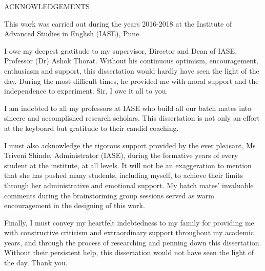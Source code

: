 \newpage
{}
\begin{center}
    \LARGE ACKNOWLEDGEMENTS
\end{center}
This  work  was  carried  out  during  the  years  2016-2018  at  the  Institute  of  Advanced  Studies  in  English  (IASE),  Pune.  

I  owe  my  deepest  gratitude  to  my  supervisor,  Director  and  Dean  of  IASE,  Professor  (Dr)  Ashok  Thorat.  Without  his  continuous  optimism,  encouragement,  enthusiasm  and  support,  this  dissertation  would  hardly  have  seen  the  light  of  the  day.  During  the  most  difficult  times,  he  provided  me  with  moral  support  and  the  independence  to  experiment.  Sir,  I  owe  it  all  to  you.

I  am  indebted  to  all  my  professors  at  IASE  who  build  all  our  batch  mates  into  sincere  and  accomplished  research  scholars.  This  dissertation  is  not  only  an  effort  at  the  keyboard  but  gratitude  to  their  candid  coaching.

I  must  also  acknowledge  the  rigorous  support  provided  by  the  ever  pleasant,  Ms  Triveni  Shinde,  Administrator  (IASE),  during  the  formative  years  of  every  student  at  the  institute,  at  all  levels.  It  will  not  be  an  exaggeration  to  mention  that  she  has  pushed  many  students,  including  myself,  to  achieve  their  limits  through  her  administrative  and  emotional  support.  My  batch  mates'  invaluable  comments  during  the  brainstorming  group  sessions  served  as  warm  encouragement  in  the  designing  of  this  work.  

Finally,  I  must  convey  my  heartfelt  indebtedness  to  my  family  for  providing  me  with  constructive  criticism  and  extraordinary  support  throughout  my  academic  years,  and  through  the  process  of  researching  and  penning  down  this  dissertation.  Without  their  persistent  help,  this  dissertation  would  not  have  seen  the  light  of  the  day.  Thank  you.
